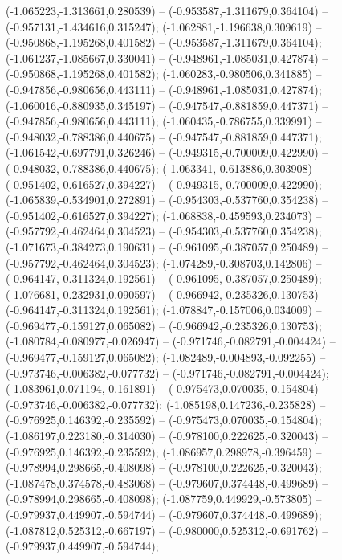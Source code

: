  (-1.065223,-1.313661,0.280539) -- (-0.953587,-1.311679,0.364104) -- (-0.957131,-1.434616,0.315247);
 (-1.062881,-1.196638,0.309619) -- (-0.950868,-1.195268,0.401582) -- (-0.953587,-1.311679,0.364104);
 (-1.061237,-1.085667,0.330041) -- (-0.948961,-1.085031,0.427874) -- (-0.950868,-1.195268,0.401582);
 (-1.060283,-0.980506,0.341885) -- (-0.947856,-0.980656,0.443111) -- (-0.948961,-1.085031,0.427874);
 (-1.060016,-0.880935,0.345197) -- (-0.947547,-0.881859,0.447371) -- (-0.947856,-0.980656,0.443111);
 (-1.060435,-0.786755,0.339991) -- (-0.948032,-0.788386,0.440675) -- (-0.947547,-0.881859,0.447371);
 (-1.061542,-0.697791,0.326246) -- (-0.949315,-0.700009,0.422990) -- (-0.948032,-0.788386,0.440675);
 (-1.063341,-0.613886,0.303908) -- (-0.951402,-0.616527,0.394227) -- (-0.949315,-0.700009,0.422990);
 (-1.065839,-0.534901,0.272891) -- (-0.954303,-0.537760,0.354238) -- (-0.951402,-0.616527,0.394227);
 (-1.068838,-0.459593,0.234073) -- (-0.957792,-0.462464,0.304523) -- (-0.954303,-0.537760,0.354238);
 (-1.071673,-0.384273,0.190631) -- (-0.961095,-0.387057,0.250489) -- (-0.957792,-0.462464,0.304523);
 (-1.074289,-0.308703,0.142806) -- (-0.964147,-0.311324,0.192561) -- (-0.961095,-0.387057,0.250489);
 (-1.076681,-0.232931,0.090597) -- (-0.966942,-0.235326,0.130753) -- (-0.964147,-0.311324,0.192561);
 (-1.078847,-0.157006,0.034009) -- (-0.969477,-0.159127,0.065082) -- (-0.966942,-0.235326,0.130753);
 (-1.080784,-0.080977,-0.026947) -- (-0.971746,-0.082791,-0.004424) -- (-0.969477,-0.159127,0.065082);
 (-1.082489,-0.004893,-0.092255) -- (-0.973746,-0.006382,-0.077732) -- (-0.971746,-0.082791,-0.004424);
 (-1.083961,0.071194,-0.161891) -- (-0.975473,0.070035,-0.154804) -- (-0.973746,-0.006382,-0.077732);
 (-1.085198,0.147236,-0.235828) -- (-0.976925,0.146392,-0.235592) -- (-0.975473,0.070035,-0.154804);
 (-1.086197,0.223180,-0.314030) -- (-0.978100,0.222625,-0.320043) -- (-0.976925,0.146392,-0.235592);
 (-1.086957,0.298978,-0.396459) -- (-0.978994,0.298665,-0.408098) -- (-0.978100,0.222625,-0.320043);
 (-1.087478,0.374578,-0.483068) -- (-0.979607,0.374448,-0.499689) -- (-0.978994,0.298665,-0.408098);
 (-1.087759,0.449929,-0.573805) -- (-0.979937,0.449907,-0.594744) -- (-0.979607,0.374448,-0.499689);
 (-1.087812,0.525312,-0.667197) -- (-0.980000,0.525312,-0.691762) -- (-0.979937,0.449907,-0.594744);
